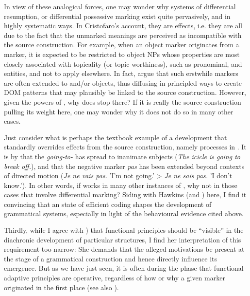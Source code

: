 \documentclass[output=paper]{langsci/langscibook}
\begin{document}
In view of these analogical forces, one may wonder why systems of differential resumption,  or differential possessive marking exist quite pervasively, and in highly systematic ways. In Cristofaro’s account, they are  effects, i.e. they are all due to the fact that the unmarked meanings are perceived as incompatible with the source construction. For example, when an object marker originates from a  marker, it is expected to be restricted to object NPs whose properties are most closely associated with topicality (or topic-worthiness), such as pronominal,  and  entities, and not to apply elsewhere. In fact, \citet{DalrympleNikolaeva2011} argue that such erstwhile  markers are often extended to  and/or  objects, thus diffusing in principled ways to create DOM patterns that may plausibly be linked to the source construction. However, given the powers of , why does  stop there? If it is really the source construction pulling its weight here, one may wonder why it does not do so in many other cases. 

\largerpage
Just consider what is perhaps the textbook example of a development that standardly overrides effects from the source construction, namely  processes in . It is by  that the \textit{going-to-} has spread to inanimate subjects (\textit{The icicle is going to break off.}), and that the  negative marker \textit{pas} has been extended beyond contexts of directed motion (\textit{Je ne vais pas.} 'I'm not going.' > \textit{Je ne sais pas.} 'I don't know.'). In other words, if  works in many other instances of , why not in those cases that involve differential marking? Siding with Hawkins (and ) here, I find it convincing that an  state of efficient coding shapes the development of grammatical systems, especially in light of the behavioural evidence cited above.

\largerpage
Thirdly, while I agree with ) that functional principles should be “visible” in the diachronic development of particular structures, I find her interpretation of this requirement too narrow: She demands that the alleged motivations be present at the  stage of a grammatical construction and hence directly influence its emergence. But as we have just seen, it is often during the  phase that functional-adaptive principles are operative, regardless of how or why a given marker originated in the first place (see also ). 
\end{document}
